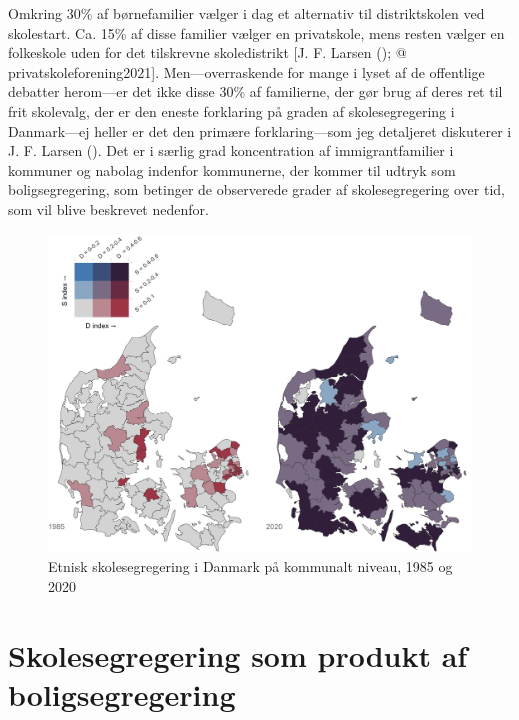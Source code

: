 \documentclass[
]{book}
\begin{document}
Omkring 30\% af børnefamilier vælger i dag et alternativ til distriktskolen ved skolestart. Ca. 15\% af disse familier vælger en privatskole, mens resten vælger en folkeskole uden for det tilskrevne skoledistrikt {[}J. F. Larsen (); @ privatskoleforening2021{]}. Men---overraskende for mange i lyset af de offentlige debatter herom---er det ikke disse 30\% af familierne, der gør brug af deres ret til frit skolevalg, der er den eneste forklaring på graden af skolesegregering i Danmark---ej heller er det den primære forklaring---som jeg detaljeret diskuterer i J. F. Larsen (). Det er i særlig grad koncentration af immigrantfamilier i kommuner og nabolag indenfor kommunerne, der kommer til udtryk som boligsegregering, som betinger de observerede grader af skolesegregering over tid, som vil blive beskrevet nedenfor.

\begin{figure}
\includegraphics[width=1\linewidth]{images/Figur4} \caption{Etnisk skolesegregering i Danmark på kommunalt niveau, 1985 og 2020}\label{fig:fig-3-3}
\end{figure}

\section{Skolesegregering som produkt af boligsegregering}\label{skolesegregering-som-produkt-af-boligsegregering}
\end{document}
